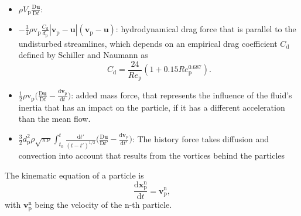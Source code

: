 \documentclass[11pt,a4paper,openany,oneside,parskip=half*]{article}
\renewcommand*\vec[1]{\boldsymbol{#1}}
\begin{document}
\begin{itemize} 
\item  $\rho V_\mathrm{p}\frac{\mathrm{D}\vec{u}}{\mathrm{D}t}$: 

\item  $-\frac{3}{4}\rho \mathrm{v}_\mathrm{p} \frac{C_\mathrm{d}}{d_\mathrm{p}}|\vec{v}_\mathrm{p}-    \vec{u}|(\vec{v}_\mathrm{p}-\vec{u})$:
hydrodynamical drag force that is parallel to the undisturbed streamlines, which depends on an empirical drag coefficient $C_{\mathrm{d}}$ defined by Schiller and Naumann as
\begin{equation} \label{C_d}
C_\mathrm{d} = \frac{24}{Re_\mathrm{p}}(1+0.15Re_\mathrm{p}^\mathrm{0.687}).
\end{equation} 
\item $\frac{1}{2}\rho \mathrm{v}_\mathrm{p} \biggl(\frac{\mathrm{D}\vec{u}}{\mathrm{D}t}-\frac{\mathrm{d}\vec{v}_\mathrm{p}}{\mathrm{d}t}\biggl)$:
added mass force, that represents the influence of the fluid's inertia that has an impact on the particle, if it has a different acceleration than the mean flow.
\item $\frac{3}{2}d_\mathrm{p}^\mathrm{2}\rho\sqrt{\pi\nu}\int_{t_\mathrm{0}}^{t} \frac{\mathrm{d}t'}{(t-t')^\mathrm{1/2}} \biggl(\frac{\mathrm{D}\vec{u}}{\mathrm{D}t'}- \frac{\mathrm{d}\vec{v}_\mathrm{p}}{\mathrm{d}t'}\biggl) $: 
The history force takes diffusion and convection into account that results from the vortices behind the particles 
\end{itemize}
 

The kinematic equation of a particle is  
\begin{equation}
 \frac{\mathrm{d}\vec{x}_\mathrm{p}^\mathrm{n}}{\mathrm{d}t} = \vec{v}_\mathrm{p}^\mathrm{n},
\end{equation}
with $\vec{v}_{\mathrm{p}}^\mathrm{n}$ being the velocity of the n-th particle.
\end{document}
